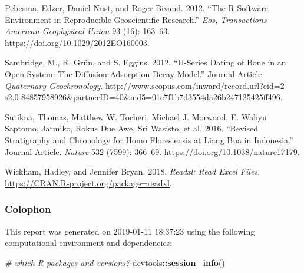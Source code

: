 \documentclass[]{elsarticle} %
\newenvironment{Shaded}{\begin{snugshade}}{\end{snugshade}}
\newcommand{\CommentTok}[1]{\textcolor[rgb]{0.56,0.35,0.01}{\textit{#1}}}
\newcommand{\KeywordTok}[1]{\textcolor[rgb]{0.13,0.29,0.53}{\textbf{#1}}}
\newcommand{\NormalTok}[1]{#1}
\newcommand{\OperatorTok}[1]{\textcolor[rgb]{0.81,0.36,0.00}{\textbf{#1}}}
\begin{document}
\leavevmode\hypertarget{ref-Pebesma_Nust_Bivand_2012}{}%
Pebesma, Edzer, Daniel Nüst, and Roger Bivand. 2012. ``The R Software Environment in Reproducible Geoscientific Research.'' \emph{Eos, Transactions American Geophysical Union} 93 (16): 163--63. \url{https://doi.org/10.1029/2012EO160003}.

\leavevmode\hypertarget{ref-Sambridge2012}{}%
Sambridge, M., R. Grün, and S. Eggins. 2012. ``U-Series Dating of Bone in an Open System: The Diffusion-Adsorption-Decay Model.'' Journal Article. \emph{Quaternary Geochronology}. \url{http://www.scopus.com/inward/record.url?eid=2-s2.0-84857958926\&partnerID=40\&md5=01e7f1b7d3554da26b247125425ff496}.

\leavevmode\hypertarget{ref-Sutikna2016}{}%
Sutikna, Thomas, Matthew W. Tocheri, Michael J. Morwood, E. Wahyu Saptomo, Jatmiko, Rokus Due Awe, Sri Wasisto, et al. 2016. ``Revised Stratigraphy and Chronology for Homo Floresiensis at Liang Bua in Indonesia.'' Journal Article. \emph{Nature} 532 (7599): 366--69. \url{https://doi.org/10.1038/nature17179}.

\leavevmode\hypertarget{ref-Wickham_readxl}{}%
Wickham, Hadley, and Jennifer Bryan. 2018. \emph{Readxl: Read Excel Files}. \url{https://CRAN.R-project.org/package=readxl}.

\newpage

\hypertarget{colophon}{%
\subsubsection{Colophon}\label{colophon}}

This report was generated on 2019-01-11 18:37:23 using the following computational environment and dependencies:

\begin{Shaded}
\begin{Highlighting}[]
\CommentTok{# which R packages and versions?}
\NormalTok{devtools}\OperatorTok{::}\KeywordTok{session_info}\NormalTok{()}
\end{Highlighting}
\end{Shaded}
\end{document}
